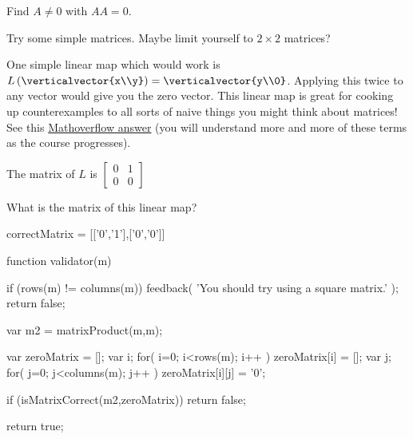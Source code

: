 \documentclass{ximera}
\begin{document}
\begin{question}
  Find $A \neq 0$ with $AA = 0$.
	\begin{hint}
		Try some simple matrices.  Maybe limit yourself to $2\times2$ matrices?
	\end{hint}
	\begin{hint}
		One simple linear map which would work is $L\left(\verticalvector{x\\y}\right) = \verticalvector{y\\0}$.  Applying this twice to any vector would 
		give you the zero vector.   This linear map is great for cooking up counterexamples to all sorts of naive things you might think about matrices!  See 
		this \href{http://mathoverflow.net/questions/16829/what-are-your-favorite-instructional-counterexamples/16841#16841}{Mathoverflow  answer} (you will understand
		more and more of these terms as the course progresses).
		
		\begin{question}
			\begin{hint}
				The matrix of $L$ is $\begin{bmatrix} 0&1\\0&0 \end{bmatrix}$
			\end{hint}
			What is the matrix of this linear map?
			\begin{matrix-answer}[name=A]
				correctMatrix = [['0','1'],['0','0']]
			\end{matrix-answer}
		\end{question}
	\end{hint}
	
  \begin{solution}
    \begin{matrix-answer}[name=A]
    function validator(m) {
      if (rows(m) != columns(m)) {
        feedback( 'You should try using a square matrix.' );
        return false;
      }
      
      var m2 = matrixProduct(m,m);
      
      var zeroMatrix = [];
      var i;
      for( i=0; i<rows(m); i++ ) {
        zeroMatrix[i] = [];
        var j;
        for( j=0; j<columns(m); j++ ) {
          zeroMatrix[i][j] = '0';
        }
      }

      if (isMatrixCorrect(m2,zeroMatrix))
        return false;

      return true;
    }
    \end{matrix-answer}
  \end{solution}
\end{question}
	
\end{document}
